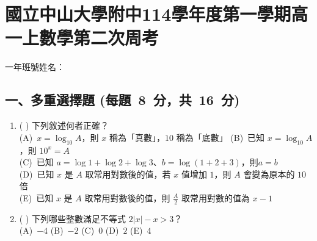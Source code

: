 \documentclass[b4paper,12pt]{exam}
\newcommand{\anslabel}[1]{%
  \makebox[3em][c]{%
    \ifshowAnswer{\color{red}#1}\else\phantom{#1}\fi
  }%
}
\newcommand\testTitle[1]{\section*{#1}}
\newcommand\testSubsection[4]{\subsection*{#1 (每#2\ #3\ 分，共\ #4\ 分)}}
\newif\ifshowAnswer
\begin{document}

{\centering
\testTitle{國立中山大學附中114學年度第一學期高一上數學第二次周考}
}

\hfill 一年\hspace{2em}班\hspace{2em}號\quad 姓名：\hspace{6em}\quad\\
\vspace{0.5em}


\testSubsection{一、多重選擇題}{題}{8}{16}
\begin{enumerate}[itemsep=0.5em, topsep=1em,
                  label=\arabic*.]
    \item(\anslabel{BCD}) 下列敘述何者正確？\\[.5em]
        (A)~{$x=\log_{10}{A}$，則 $x$ 稱為「真數」，$10$ 稱為「底數」}\hspace{1em}
        (B)~{已知 $x=\log_{10}{A}$，則 $10^x=A$}\\[.5em]
        (C)~{已知 $a=\log{1}+\log{2}+\log{3}$、$b=\log{(1+2+3)}$，則$a=b$}\\[.5em]
        (D)~{已知 $x$ 是 $A$ 取常用對數後的值，若 $x$ 值增加 $1$，則 $A$ 會變為原本的 $10$ 倍}\\[.5em]
        (E)~{已知 $x$ 是 $A$ 取常用對數後的值，則 $\frac{A}{2}$ 取常用對數的值為 $x-1$}

    \item(\anslabel{ABE}) 下列哪些整數滿足不等式 $2|x|-x > 3$？\\[.5em]
        (A)~{$-4$}\hspace{2em}
        (B)~{$-2$}\hspace{2em}
        (C)~{$0$}\hspace{2em}
        (D)~{$2$}\hspace{2em}
        (E)~{$4$}\\
\end{enumerate}

\end{document}
